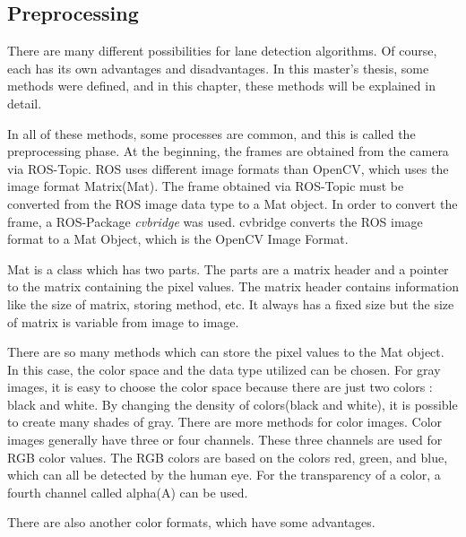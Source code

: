 %
\subsection{Preprocessing}\label{sec:Preprocessing}

There are many different possibilities for lane detection algorithms. Of course, each has its own advantages and disadvantages. In this master's thesis, some methods were defined, and in this chapter, these methods will be explained in detail.

In all of these methods, some processes are common, and this is called the preprocessing phase. At the beginning, the frames are obtained from the camera via ROS-Topic. ROS uses different image formats than OpenCV, which uses the image format Matrix(Mat). The frame obtained via ROS-Topic must be converted from the ROS image data type to a Mat object. In order to convert the frame, a ROS-Package \textit{cvbridge}\cite{cv_bridge} was used. cvbridge converts the ROS image format to a Mat Object, which is the OpenCV Image Format. 

Mat is a class which has two parts. The parts are a matrix header and a pointer to the matrix containing the pixel values. The matrix header contains information like the size of matrix, storing method, etc. It always has a fixed size but the size of matrix is variable from image to image.

There are so many methods which can store the pixel values to the Mat object. In this case, the color space and the data type utilized can be chosen. For gray images, it is easy to choose the color space because there are just two colors : black and white. By changing the density of colors(black and white), it is possible to create many shades of gray. There are more methods for color images. Color images generally have three or four channels. These three channels are used for RGB color values. The RGB colors are based on the colors red, green, and blue, which can all be detected by the human eye. For the transparency of a color, a fourth channel called alpha(A) can be used.

There are also another color formats, which have some advantages\cite{OpenCV_Mat}. 

